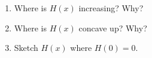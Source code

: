 \documentclass[12pt]{article}
\begin{document}
\begin{enumerate}
\begin{enumerate}
	\item Where is $H(x)$ increasing? Why?
	\vfill
	\item Where is $H(x)$ concave up? Why?
	\vfill
	\item Sketch $H(x)$ where $H(0)=0$.
	\end{enumerate}


\end{enumerate}
\end{document}

